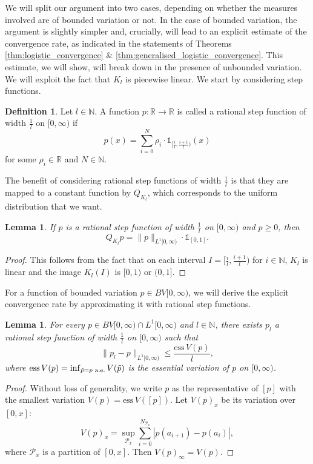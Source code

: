 \documentclass[a4paper]{article}
\newtheorem{lemma}[theorem]{Lemma}%
\theoremstyle{definition}
\newtheorem{definition}[theorem]{Definition}
\numberwithin{equation}{section}
\numberwithin{theorem}{section}
\newcommand{\ess}{\mathrm{ess}\,}
\begin{document}
{We will split our argument into two cases, depending on whether the measures involved are of bounded variation or not. In the case of bounded variation, the argument is slightly simpler and, crucially, will lead to an explicit estimate of the convergence rate, as indicated in the statements of Theorems \ref{thm:logistic_convergence} \& \ref{thm:generalised_logistic_convergence}. This estimate, we will show, will break down in the presence of unbounded variation. We will exploit the fact that $K_l$ is piecewise linear. We start by considering step functions.
\begin{definition}
    Let $l\in\mathbb{N}$. A function $p:\mathbb{R}\to\mathbb{R}$ is called a rational step function of width $\frac{1}{l}$ on $[0,\infty)$ if
    \begin{equation*}
    p(x) = \sum_{i=0}^N \rho_i\cdot\mathds{1}_{[\frac{i}{l}, \frac{i+1}{l})}(x)
    \end{equation*}
    for some $\rho_i\in\mathbb{R}$ and $N\in\mathbb{N}$.
\end{definition} 
The benefit of considering rational step functions of width $\frac{1}{l}$ is that they are mapped to a constant function by $Q_{K_l}$, which corresponds to the uniform distribution that we want.
\begin{lemma} \label{lm:Rstep_vanish}
    If $p$ is a rational step function of width $\frac{1}{l}$ on $[0,\infty)$ and $p\geq0$, then \begin{equation*}
        Q_{K_{l}} p = \lVert p \rVert_{ L^1[0,\infty)}\cdot\mathds{1}_{[0,1]}.
    \end{equation*}
\end{lemma}
\begin{proof}
    This follows from the fact that on each interval $I = [\frac{i}{l}, \frac{i+1}{l})$ for $i\in\mathbb{N}$, $K_l$ is linear and the image $K_l(I)$ is $[0,1)$ or $(0,1]$.
\end{proof}

For a function of bounded variation $p\in BV[0,\infty)$, we will derive the explicit convergence rate by approximating it with rational step functions.

\begin{lemma} \label{lm:Rstep_approx}
    For every $p\in BV[0,\infty)\cap L^1[0,\infty)$ and $l\in\mathbb{N}$, there exists $p_l$ a rational step function of width $\frac{1}{l}$ on $[0,\infty)$ such that
    \begin{equation*}
        \lVert p_l - p\rVert_{ L^1[0,\infty)} \leq \frac{\ess V(p)}{l},
    \end{equation*}
    where $\ess V(p)=\inf_{\Tilde{p}=p\text{ a.e.}}V(\Tilde{p})$ is the essential variation of $p$ on $[0,\infty)$.
\end{lemma}
\begin{proof}
    Without loss of generality, we write $p$ as the representative of $[p]$ with the smallest variation $V(p) = \ess V([p])$. Let $V(p)_x$ be its variation over $[0,x]$:
    \begin{equation*}
        V(p)_x = \sup_{\mathcal{P}_x}\sum_{i=0}^{N_{\mathcal{P}_x}} |p(a_{i+1})-p(a_i)|,
    \end{equation*}
    where $\mathcal{P}_x$ is a partition of $[0,x]$. Then $V(p)_\infty=V(p)$.
    

\end{proof}}
\end{document}
